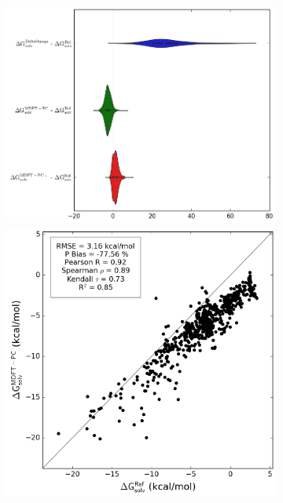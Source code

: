 \begin{figure}[h]
   \begin{subfigure}[b]{0.40\textwidth}
         \includegraphics[width=\textwidth]{chapters/BDD/images/freesolv_1/error_distribution_calc_all.png}
         \par\bigskip
         \includegraphics[width=\textwidth]{chapters/BDD/images/freesolv_1/correlation__mdft_energy_pc__vs__calc.png}

\end{subfigure}
\end{figure}
